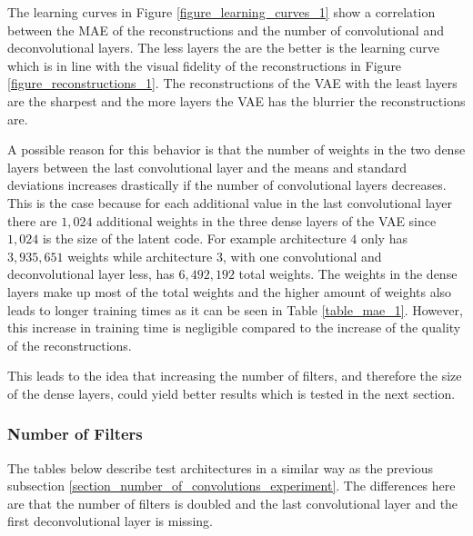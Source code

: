 The learning curves in Figure \ref{figure_learning_curves_1} show a correlation between the MAE of the
reconstructions and the number of convolutional and deconvolutional layers. The less layers the are the better
is the learning curve which is in line with the visual fidelity of the reconstructions in Figure 
\ref{figure_reconstructions_1}. The reconstructions of the VAE with the least layers are the sharpest and the 
more layers the VAE has the blurrier the reconstructions are. 

A possible reason for this behavior is that the number of weights in the two dense layers between the 
last convolutional layer and the means and standard deviations increases drastically
if the number of convolutional layers decreases. This is the case because for each additional
value in the last convolutional layer there are $1,024$ additional weights in the three dense layers of the VAE
since $1,024$ is the size of the latent code. For example architecture $4$ only has $3,935,651$ weights while
architecture $3$, with one convolutional and deconvolutional layer less, has $6,492,192$ total weights.
The weights in the dense layers make up most of the total weights
and the higher amount of weights also leads to longer training times as it can be seen in Table \ref{table_mae_1}.
However, this increase in training time is negligible compared to the increase of the quality of the reconstructions. 

This leads to the idea that increasing the number of filters, and therefore the size of the dense layers, could yield
better results which is tested in the next section.



\subsubsection{Number of Filters} \label{section_number_of_filters}

The tables below describe test architectures in a similar way as the previous subsection 
\ref{section_number_of_convolutions_experiment}. The differences here are that the number of filters is doubled and
the last convolutional layer and the first deconvolutional layer is missing.


